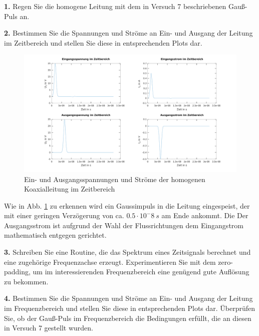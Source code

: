 \documentclass[Protokollheft.tex]{subfiles}
\begin{document}
\begin{framed}
	\noindent \textbf{1.} Regen Sie die homogene Leitung mit dem in Versuch 7 beschriebenen
Gauß-Puls an.\label{exer:exciteGauss}
\end{framed}
\begin{framed}
	\noindent \textbf{2.} Bestimmen Sie die Spannungen und Ströme an Ein- und Ausgang der Leitung
 im Zeitbereich und stellen Sie diese in entsprechenden Plots dar.\label{exer:UandVtimeDomain}
\end{framed}
\noindent
\begin{figure}
	\centering
	\includegraphics[width=0.9\linewidth]{EinAusSpanStromZeit}
	\caption{Ein- und Ausgangsspannungen  und Ströme der homogenen Koaxialleitung im Zeitbereich}
	\label{fig:einausspanstromzeit}
\end{figure}
Wie in Abb. \ref{fig:einausspanstromzeit} zu erkennen wird ein Gaussimpuls in die Leitung eingespeist, der mit einer geringen Verzögerung von ca. $0.5\cdot 10^-8 \ \si{s}$  am Ende ankommt. Die Der Ausgangsstrom ist aufgrund der Wahl der Flussrichtungen dem Eingangstrom mathematisch entgegen gerichtet.  
\begin{framed}
	\noindent \textbf{3.} Schreiben Sie eine Routine, die das Spektrum eines
Zeitsignals berechnet und eine zugehörige Frequenzachse erzeugt.
Experimentieren Sie mit dem zero-padding, um im interessierenden
Frequenzbereich eine genügend gute Auflösung zu bekommen.\label{exer:calcFreqSpectWithAxis}
\end{framed}
\begin{framed}
	\noindent \textbf{4.} Bestimmen Sie die Spannungen und Ströme an Ein- und Ausgang der Leitung 
im Frequenzbereich und stellen Sie diese in entsprechenden Plots dar. Überprüfen Sie, ob 
der Gauß-Puls im Frequenzbereich die Bedingungen erfüllt, die an 
diesen in Versuch 7 gestellt wurden.\label{exer:UandVfreqDomain}
\end{framed}
\end{document}
